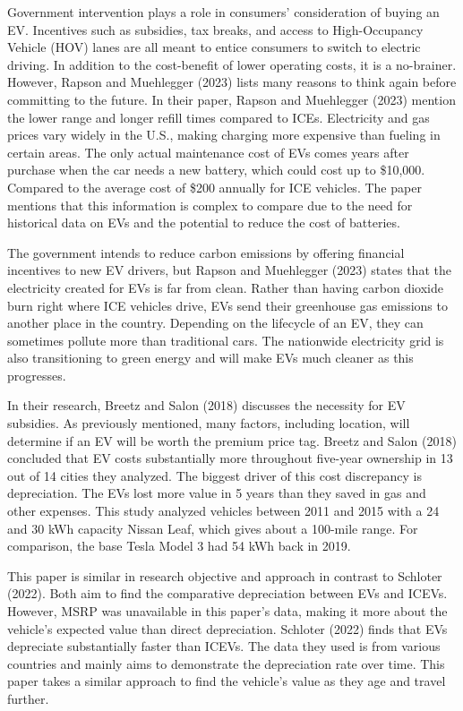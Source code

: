 \documentclass{article}
\begin{document}
Government intervention plays a role in consumers' consideration of
buying an EV. Incentives such as subsidies, tax breaks, and access to
High-Occupancy Vehicle (HOV) lanes are all meant to entice consumers to
switch to electric driving. In addition to the cost-benefit of lower
operating costs, it is a no-brainer. However, Rapson and Muehlegger
(2023) lists many reasons to think again before committing to the
future. In their paper, Rapson and Muehlegger (2023) mention the lower
range and longer refill times compared to ICEs. Electricity and gas
prices vary widely in the U.S., making charging more expensive than
fueling in certain areas. The only actual maintenance cost of EVs comes
years after purchase when the car needs a new battery, which could cost
up to \$10,000. Compared to the average cost of \$200 annually for ICE
vehicles. The paper mentions that this information is complex to compare
due to the need for historical data on EVs and the potential to reduce
the cost of batteries.

The government intends to reduce carbon emissions by offering financial
incentives to new EV drivers, but Rapson and Muehlegger (2023) states
that the electricity created for EVs is far from clean. Rather than
having carbon dioxide burn right where ICE vehicles drive, EVs send
their greenhouse gas emissions to another place in the country.
Depending on the lifecycle of an EV, they can sometimes pollute more
than traditional cars. The nationwide electricity grid is also
transitioning to green energy and will make EVs much cleaner as this
progresses.

In their research, Breetz and Salon (2018) discusses the necessity for
EV subsidies. As previously mentioned, many factors, including location,
will determine if an EV will be worth the premium price tag. Breetz and
Salon (2018) concluded that EV costs substantially more throughout
five-year ownership in 13 out of 14 cities they analyzed. The biggest
driver of this cost discrepancy is depreciation. The EVs lost more value
in 5 years than they saved in gas and other expenses. This study
analyzed vehicles between 2011 and 2015 with a 24 and 30 kWh capacity
Nissan Leaf, which gives about a 100-mile range. For comparison, the
base Tesla Model 3 had 54 kWh back in 2019.

This paper is similar in research objective and approach in contrast to
Schloter (2022). Both aim to find the comparative depreciation between
EVs and ICEVs. However, MSRP was unavailable in this paper's data,
making it more about the vehicle's expected value than direct
depreciation. Schloter (2022) finds that EVs depreciate substantially
faster than ICEVs. The data they used is from various countries and
mainly aims to demonstrate the depreciation rate over time. This paper
takes a similar approach to find the vehicle's value as they age and
travel further.
\end{document}
